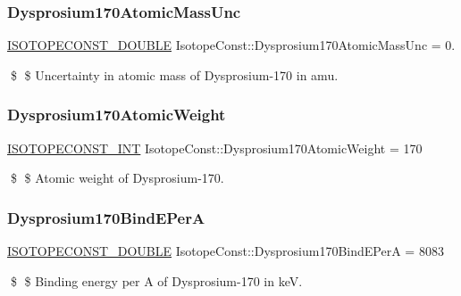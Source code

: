 \subsubsection{\texorpdfstring{Dysprosium170\+Atomic\+Mass\+Unc}{Dysprosium170AtomicMassUnc}}
{\footnotesize\ttfamily \mbox{\hyperlink{group___isotope_const-_macros_ga8f45a7272ce02c0b4c65c44636ed719a}{I\+S\+O\+T\+O\+P\+E\+C\+O\+N\+S\+T\+\_\+\+D\+O\+U\+B\+LE}} Isotope\+Const\+::\+Dysprosium170\+Atomic\+Mass\+Unc = 0.}

\$ \$ Uncertainty in atomic mass of Dysprosium-\/170 in amu. \mbox{\label{group___isotope_const-_dysprosium-_dy170_ga230849b991b7397fa33c382f6b440681}} 
\subsubsection{\texorpdfstring{Dysprosium170\+Atomic\+Weight}{Dysprosium170AtomicWeight}}
{\footnotesize\ttfamily \mbox{\hyperlink{group___isotope_const-_macros_ga5f18360b3e99483a35c32d789e62621c}{I\+S\+O\+T\+O\+P\+E\+C\+O\+N\+S\+T\+\_\+\+I\+NT}} Isotope\+Const\+::\+Dysprosium170\+Atomic\+Weight = 170}

\$ \$ Atomic weight of Dysprosium-\/170. \mbox{\label{group___isotope_const-_dysprosium-_dy170_ga7d41233f3eaeb52506e865a0093f6663}} 
\subsubsection{\texorpdfstring{Dysprosium170\+Bind\+E\+PerA}{Dysprosium170BindEPerA}}
{\footnotesize\ttfamily \mbox{\hyperlink{group___isotope_const-_macros_ga8f45a7272ce02c0b4c65c44636ed719a}{I\+S\+O\+T\+O\+P\+E\+C\+O\+N\+S\+T\+\_\+\+D\+O\+U\+B\+LE}} Isotope\+Const\+::\+Dysprosium170\+Bind\+E\+PerA = 8083}

\$ \$ Binding energy per A of Dysprosium-\/170 in keV. \mbox{\label{group___isotope_const-_dysprosium-_dy170_gaecff5dfd057df77f05b3e6935b0bd935}} 
